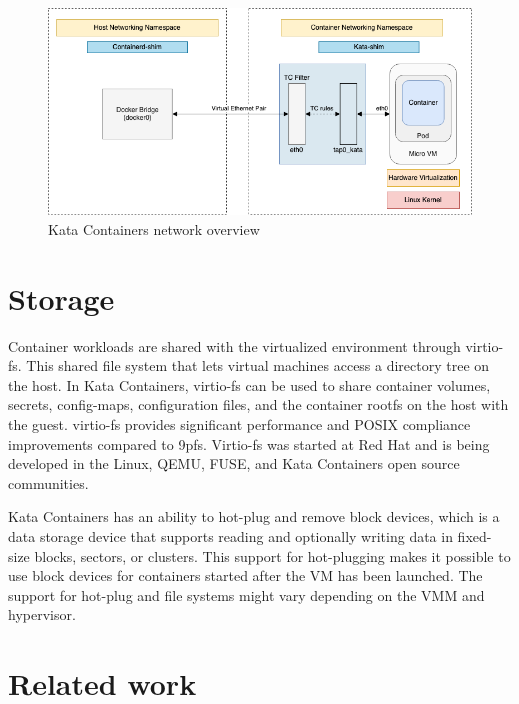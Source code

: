 \begin{figure}[ht]
  \begin{center}
    \includegraphics[width=13.5cm]{LaTeX/images/KataContainersNetwork.png}
    \caption{Kata Containers network overview \cite{KataContainersArchitecture}}
    \label{fig:KataContainersNetwork}
  \end{center}
\end{figure}

\section{Storage}

Container workloads are shared with the virtualized environment through virtio-fs. This shared file system that lets virtual machines access a directory tree on the host. In Kata Containers, virtio-fs can be used to share container volumes, secrets, config-maps, configuration files, and the container rootfs on the host with the guest. virtio-fs provides significant performance and POSIX compliance improvements compared to 9pfs. Virtio-fs was started at Red Hat and is being developed in the Linux, QEMU, FUSE, and Kata Containers open source communities. \cite{virtio-fs-Kata}\cite{virtio-fs}

Kata Containers has an ability to hot-plug and remove block devices, which is a data storage device that supports reading and optionally writing data in fixed-size blocks, sectors, or clusters. This support for hot-plugging makes it possible to use block devices for containers started after the VM has been launched. The support for hot-plug and file systems might vary depending on the VMM and hypervisor. \cite{KataContainersArchitecture}\cite{KataContainersVirtualization}

\section{Related work}

